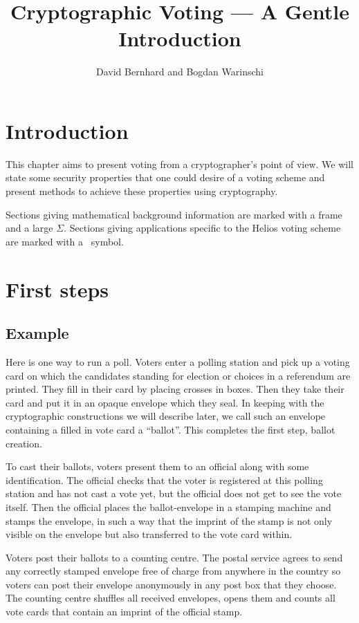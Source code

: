 \documentclass[envcountsame]{llncs}
\title{Cryptographic Voting --- A Gentle Introduction}
\author{David Bernhard and Bogdan Warinschi}
\institute{University of Bristol, England}
\begin{document}
\maketitle

\let\oldclearpage\clearpage
\let\clearpage\relax
\setcounter{tocdepth}{2}
\vfil
\tableofcontents
\let\clearpage\oldclearpage
\clearpage

\section{Introduction}

This chapter aims to present voting from a cryptographer's point of view. We
will state some security properties that one could desire of a voting scheme and
present methods to achieve these properties using cryptography.

Sections giving mathematical background information are marked with a frame and
a large $\Sigma$. Sections giving applications specific to the Helios voting
scheme are marked with a \Sun\ symbol.

\section{First steps}

\subsection{Example}

Here is one way to run a poll. Voters enter a polling station and pick up a voting card on which the candidates standing for election or choices in a referendum are printed. They fill in their card by placing crosses in boxes. Then they take their card and put it in an opaque envelope which they seal. In keeping with the cryptographic constructions we will describe later, we call such an envelope containing a filled in vote card a ``ballot''. This completes the first step, ballot creation.

To cast their ballots, voters present them to an official along with some identification. The official checks that the voter is registered at this polling station and has not cast a vote yet, but the official does not get to see the vote itself. Then the official places the ballot-envelope in a stamping machine and stamps the envelope, in such a way that the imprint of the stamp is not only visible on the envelope but also transferred to the vote card within.

Voters post their ballots to a counting centre. The postal service agrees to
send any correctly stamped envelope free of charge from anywhere in the country
so voters can post their envelope anonymously in any post box that they choose.
The counting centre shuffles all received envelopes, opens them and counts all
vote cards that contain an imprint of the official stamp.
\end{document}

